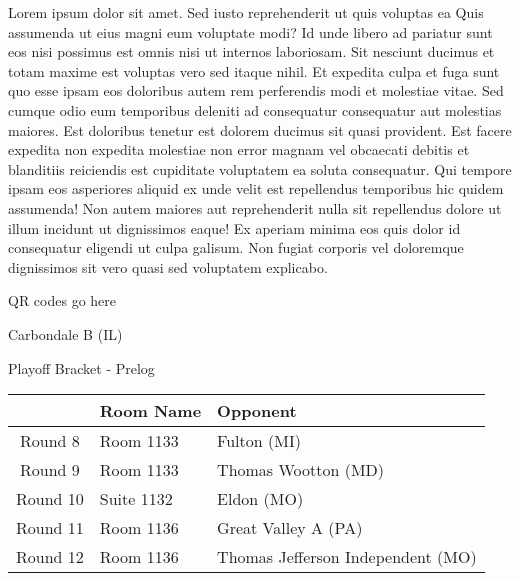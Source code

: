 \documentclass{article}%
\begin{document}
\vspace*{8pt}%
\linebreak%
\newline%
\newline%
Lorem ipsum dolor sit amet. Sed iusto reprehenderit ut quis voluptas ea Quis assumenda ut eius magni eum voluptate modi? Id unde libero ad pariatur sunt eos nisi possimus est omnis nisi ut internos laboriosam. Sit nesciunt ducimus et totam maxime est voluptas vero sed itaque nihil. Et expedita culpa et fuga sunt quo esse ipsam eos doloribus autem rem perferendis modi et molestiae vitae.\newline%
\newline%
Sed cumque odio eum temporibus deleniti ad consequatur consequatur aut molestias maiores. Est doloribus tenetur est dolorem ducimus sit quasi provident. Est facere expedita non expedita molestiae non error magnam vel obcaecati debitis et blanditiis reiciendis est cupiditate voluptatem ea soluta consequatur. Qui tempore ipsam eos asperiores aliquid ex unde velit est repellendus temporibus hic quidem assumenda!\newline%
\newline%
Non autem maiores aut reprehenderit nulla sit repellendus dolore ut illum incidunt ut dignissimos eaque! Ex aperiam minima eos quis dolor id consequatur eligendi ut culpa galisum. Non fugiat corporis vel doloremque dignissimos sit vero quasi sed voluptatem explicabo.\newline%
\newline%
%
\vspace*{30pt}%
\begin{center}%
\begin{Huge}%
QR codes go here%
\end{Huge}%
\end{center}%
\newpage%
\begin{center}%
\begin{Huge}%
Carbondale B (IL)%
\end{Huge}%
\vspace*{8pt}%
\linebreak%
\begin{Large}%
Playoff Bracket {-} Prelog%
\end{Large}%
\end{center}%
%
\begin{tabularx}{\textwidth}{|c|Y|Y|}%
\hline%
&Room Name&Opponent\\%
\hline%
Round 8&Room 1133&Fulton (MI)\\%
Round 9&Room 1133&Thomas Wootton (MD)\\%
Round 10&Suite 1132&Eldon (MO)\\%
Round 11&Room 1136&Great Valley A (PA)\\%
Round 12&Room 1136&Thomas Jefferson Independent (MO)\\%
\hline%
\end{tabularx}%
\end{document}
